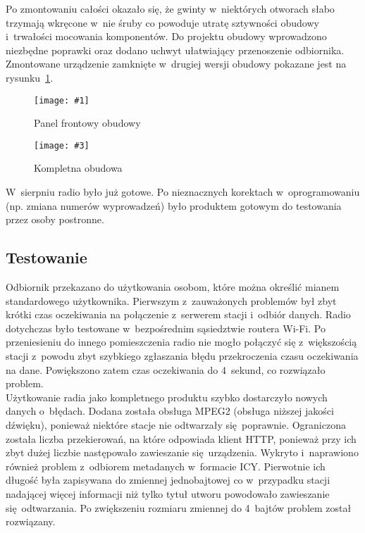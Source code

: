 \documentclass[polish]{aghengthesis}
\newcommand{\imgintss}[5]{
	\begin{figure}[{#5}]
		\centering
		\begin{minipage}{.45\textwidth}
			\centering
			\texttt{[image: \#1]}
			\caption{#2}
			\label{#1}
		\end{minipage}%
		\hfill
		\begin{minipage}{.45\textwidth}
			\centering
			\texttt{[image: \#3]}
			\caption{#4}
			\label{#3}
		\end{minipage}
	\end{figure}
}
\newcommand{\imghss}[4]{\imgintss{#1}{#2}{#3}{#4}{H}}
\begin{document}
			Po zmontowaniu całości okazało się, że gwinty w~niektórych otworach słabo trzymają wkręcone w~nie śruby co powoduje utratę sztywności obudowy i~trwałości mocowania komponentów. Do projektu obudowy wprowadzono niezbędne poprawki oraz dodano uchwyt ułatwiający przenoszenie odbiornika. Zmontowane urządzenie zamknięte w~drugiej wersji obudowy pokazane jest na rysunku~\ref{4/case2}.
			
			
			\imghss{4/case1}{Panel frontowy obudowy}{4/case2}{Kompletna obudowa}
			
			W~sierpniu radio było już gotowe. Po nieznacznych korektach w~oprogramowaniu (np. zmiana numerów wyprowadzeń) było produktem gotowym do testowania przez osoby postronne.

		\subsection{Testowanie}
			Odbiornik przekazano do użytkowania osobom, które można określić mianem standardowego użytkownika.
			Pierwszym z~zauważonych problemów był zbyt krótki czas oczekiwania na połączenie z~serwerem stacji i~odbiór danych. Radio dotychczas było testowane w~bezpośrednim sąsiedztwie routera Wi-Fi. Po przeniesieniu do innego pomieszczenia radio nie mogło połączyć się z~większością stacji z~powodu zbyt szybkiego zgłaszania błędu przekroczenia czasu oczekiwania na dane.
			Powiększono zatem czas oczekiwania do 4~sekund, co rozwiązało problem.
			$ $\\
			
			Użytkowanie radia jako kompletnego produktu szybko dostarczyło nowych danych o~błędach. Dodana została obsługa MPEG2 (obsługa niższej jakości dźwięku), ponieważ niektóre stacje nie odtwarzały się poprawnie. Ograniczona została liczba przekierowań, na które odpowiada klient HTTP, ponieważ przy ich zbyt dużej liczbie następowało zawieszanie się urządzenia.
			Wykryto i~naprawiono również problem z~odbiorem metadanych w~formacie ICY. Pierwotnie ich długość była zapisywana do zmiennej jednobajtowej co w~przypadku stacji nadającej więcej informacji niż tylko tytuł utworu powodowało zawieszanie się odtwarzania. Po zwiększeniu rozmiaru zmiennej do 4~bajtów problem został rozwiązany.
			$ $\\
			
\end{document}
